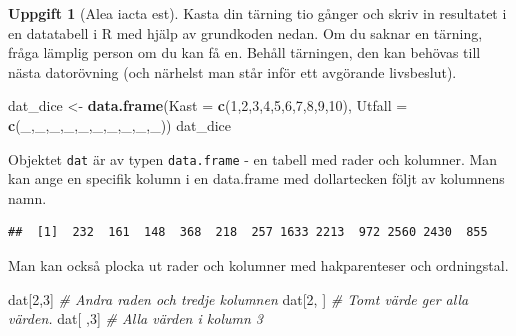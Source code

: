 \documentclass[
]{book}
\newenvironment{Shaded}{\begin{snugshade}}{\end{snugshade}}
\newcommand{\AttributeTok}[1]{\textcolor[rgb]{0.13,0.29,0.53}{#1}}
\newcommand{\CommentTok}[1]{\textcolor[rgb]{0.56,0.35,0.01}{\textit{#1}}}
\newcommand{\DecValTok}[1]{\textcolor[rgb]{0.00,0.00,0.81}{#1}}
\newcommand{\FunctionTok}[1]{\textcolor[rgb]{0.13,0.29,0.53}{\textbf{#1}}}
\newcommand{\NormalTok}[1]{#1}
\newcommand{\OtherTok}[1]{\textcolor[rgb]{0.56,0.35,0.01}{#1}}
\newcommand{\SpecialCharTok}[1]{\textcolor[rgb]{0.81,0.36,0.00}{\textbf{#1}}}
\theoremstyle{definition}
\theoremstyle{definition}
\theoremstyle{definition}
\newtheorem{exercise}{Uppgift}[chapter]
\theoremstyle{definition}
\theoremstyle{remark}
\begin{document}
\begin{exercise}[Alea iacta est]

Kasta din tärning tio gånger och skriv in resultatet i en datatabell i R med hjälp av grundkoden nedan. Om du saknar en tärning, fråga lämplig person om du kan få en. Behåll tärningen, den kan behövas till nästa datorövning (och närhelst man står inför ett avgörande livsbeslut).

\begin{Shaded}
\begin{Highlighting}[]
\NormalTok{dat\_dice }\OtherTok{\textless{}{-}} \FunctionTok{data.frame}\NormalTok{(}\AttributeTok{Kast =} \FunctionTok{c}\NormalTok{(}\DecValTok{1}\NormalTok{,}\DecValTok{2}\NormalTok{,}\DecValTok{3}\NormalTok{,}\DecValTok{4}\NormalTok{,}\DecValTok{5}\NormalTok{,}\DecValTok{6}\NormalTok{,}\DecValTok{7}\NormalTok{,}\DecValTok{8}\NormalTok{,}\DecValTok{9}\NormalTok{,}\DecValTok{10}\NormalTok{),}
                       \AttributeTok{Utfall =} \FunctionTok{c}\NormalTok{(\_,\_,\_,\_,\_,\_,\_,\_,\_,\_))}
\NormalTok{dat\_dice}
\end{Highlighting}
\end{Shaded}

\end{exercise}

Objektet \texttt{dat} är av typen \texttt{data.frame} - en tabell med rader och kolumner. Man kan ange en specifik kolumn i en data.frame med dollartecken följt av kolumnens namn.

\begin{Shaded}
\end{Shaded}

\begin{verbatim}
##  [1]  232  161  148  368  218  257 1633 2213  972 2560 2430  855
\end{verbatim}

Man kan också plocka ut rader och kolumner med hakparenteser och ordningstal.

\begin{Shaded}
\begin{Highlighting}[]
\NormalTok{dat[}\DecValTok{2}\NormalTok{,}\DecValTok{3}\NormalTok{]          }\CommentTok{\# Andra raden och tredje kolumnen}
\NormalTok{dat[}\DecValTok{2}\NormalTok{, ]          }\CommentTok{\# Tomt värde ger alla värden.}
\NormalTok{dat[ ,}\DecValTok{3}\NormalTok{]          }\CommentTok{\# Alla värden i kolumn 3}
\end{Highlighting}
\end{Shaded}
\end{document}
